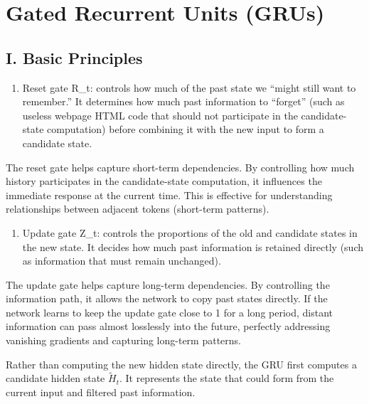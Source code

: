 \setcounter{section}{3}

\hypertarget{gated-recurrent-units-grus}{%
\section{Gated Recurrent Units (GRUs)}\label{gated-recurrent-units-grus}}

\hypertarget{i.-basic-principles}{%
\subsection{I. Basic Principles}\label{i.-basic-principles}}

\begin{enumerate}
\def\labelenumi{\arabic{enumi}.}
\tightlist
\item
  Reset gate R\_t: controls how much of the past state we ``might still want to remember.'' It determines how much past information to ``forget'' (such as useless webpage HTML code that should not participate in the candidate-state computation) before combining it with the new input to form a candidate state.
\end{enumerate}

The reset gate helps capture short-term dependencies. By controlling how much history participates in the candidate-state computation, it influences the immediate response at the current time. This is effective for understanding relationships between adjacent tokens (short-term patterns).

\begin{enumerate}
\def\labelenumi{\arabic{enumi}.}
\setcounter{enumi}{1}
\tightlist
\item
  Update gate Z\_t: controls the proportions of the old and candidate states in the new state. It decides how much past information is retained directly (such as information that must remain unchanged).
\end{enumerate}

The update gate helps capture long-term dependencies. By controlling the information path, it allows the network to copy past states directly. If the network learns to keep the update gate close to 1 for a long period, distant information can pass almost losslessly into the future, perfectly addressing vanishing gradients and capturing long-term patterns.

Rather than computing the new hidden state directly, the GRU first computes a candidate hidden state \(\tilde{H}_t\). It represents the state that could form from the current input and filtered past information.

